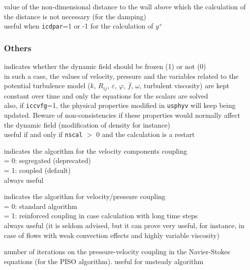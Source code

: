 {value of the non-dimensional distance to the wall above which the
calculation of the distance is not necessary (for the damping)\\
useful when {\tt icdpar}=1 or -1 for the calculation of $y^+$}


\subsubsection{Others}

{indicates whether the dynamic field should be frozen (1) or not (0)\\
in such a case, the values of velocity,
pressure and the variables related to the potential turbulence model
($k$, $R_{ij}$, $\varepsilon$, $\varphi$, $\bar{f}$, $\omega$, turbulent viscosity) are kept
constant over time and only the equations for the scalars are solved\\
also, if {\tt iccvfg}=1, the physical properties modified in \texttt{usphyv} will keep
being updated. Beware of non-consistencies if these properties would normally
affect the dynamic field (modification of density for instance)\\
useful if and only if {\tt nscal} $>$ 0 and the calculation is a restart}

{indicates the algorithm for the velocity components coupling\\
\hspace*{1.3cm}= 0: segregated (deprecated)\\
\hspace*{1.3cm}= 1: coupled (default)\\
always useful
}

{indicates the algorithm for velocity/pressure coupling\\
\hspace*{1.3cm}= 0: standard algorithm\\
\hspace*{1.3cm}= 1: reinforced coupling in case calculation with long
time steps\\
always useful (it is seldom advised, but it can prove very useful, for instance,
in case of flows with weak convection effects and highly variable viscosity)}

{number of iterations on the pressure-velocity coupling in the Navier-Stokes equations (for the PISO algorithm).
useful for unsteady algorithm
}

